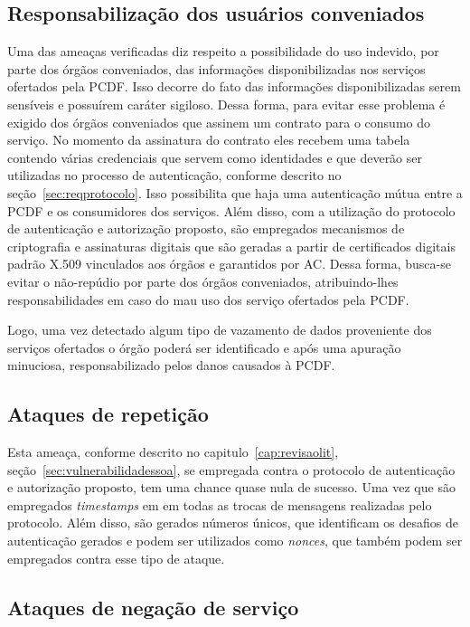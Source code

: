 \subsection{Responsabilização dos usuários conveniados}

Uma das ameaças verificadas diz respeito a possibilidade do uso indevido, por parte dos órgãos conveniados, das informações disponibilizadas nos serviços ofertados pela PCDF. Isso decorre do fato das informações disponibilizadas serem sensíveis e possuírem caráter sigiloso. Dessa forma, para evitar esse problema é exigido dos órgãos conveniados que assinem um contrato para o consumo do serviço. No momento da assinatura do contrato eles recebem uma tabela contendo várias credenciais que servem como identidades e que deverão ser utilizadas no processo de autenticação, conforme descrito no seção~\ref{sec:reqprotocolo}. Isso possibilita que haja uma autenticação mútua entre a PCDF e os consumidores dos serviços. Além disso, com a utilização do protocolo de autenticação e autorização proposto, são empregados mecanismos de criptografia e assinaturas digitais que são geradas a partir de certificados digitais padrão X.509 vinculados aos órgãos e garantidos por AC. Dessa forma, busca-se evitar o não-repúdio por parte dos órgãos conveniados, atribuindo-lhes responsabilidades em caso do mau uso dos serviço ofertados pela PCDF.

Logo, uma vez detectado algum tipo de vazamento de dados proveniente dos serviços ofertados o órgão poderá ser identificado e após uma apuração minuciosa, responsabilizado pelos danos causados à PCDF.

\subsection{Ataques de repetição}
Esta ameaça, conforme descrito no capitulo~\ref{cap:revisaolit}, seção~\ref{sec:vulnerabilidadessoa}, se empregada contra o protocolo de autenticação e autorização proposto, tem uma chance quase nula de sucesso. Uma vez que são empregados \emph{timestamps} em em todas as trocas de mensagens realizadas pelo protocolo. Além disso, são gerados números únicos, que identificam os desafios de autenticação gerados e podem ser utilizados como \emph{nonces}, que também podem ser empregados contra esse tipo de ataque.

\subsection{Ataques de negação de serviço}

